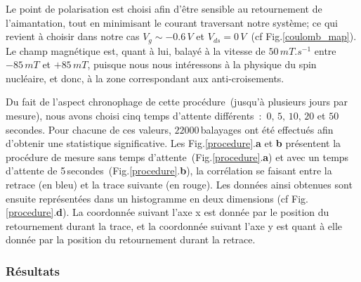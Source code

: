 Le point de polarisation est choisi afin d'être sensible au retournement de l'aimantation, tout en minimisant le courant traversant notre système; ce qui revient à choisir dans notre cas $V_g \sim -0.6\,V$ et $V_{ds}=0\,V$~(cf Fig.\ref{coulomb_map}). Le champ magnétique est, quant à lui, balayé à la vitesse de $50\,mT.s^{-1}$ entre $-85\,mT$ et $+85\,mT$, puisque nous nous intéressons à la physique du spin nucléaire, et donc, à la zone correspondant aux anti-croisements.

Du fait de l'aspect chronophage de cette procédure~(jusqu'à plusieurs jours par mesure), nous avons choisi cinq temps d'attente différents~:~$0,\,5,\,10,\,20$ et $50$ secondes. Pour chacune de ces valeurs, $22000$\,balayages ont été effectués afin d'obtenir une statistique significative.
Les Fig.\ref{procedure}.\textbf{a} et \textbf{b} présentent la procédure de mesure sans temps d'attente~(Fig.\ref{procedure}.\textbf{a}) et avec un temps d'attente de 5\,secondes~(Fig.\ref{procedure}.\textbf{b}), la corrélation se faisant entre la retrace (en bleu) et la trace suivante (en rouge). Les données ainsi obtenues sont ensuite représentées dans un histogramme en deux dimensions (cf Fig.\ref{procedure}.\textbf{d}). La coordonnée suivant l'axe x est donnée par le position du retournement durant la trace, et la coordonnée suivant l'axe y est quant à elle donnée par la position du retournement durant la retrace.


\subsubsection{Résultats}

